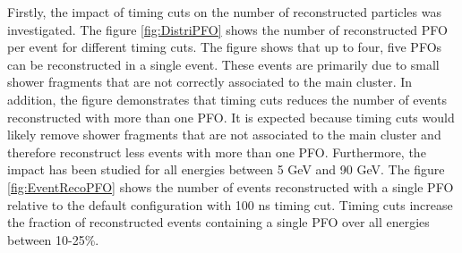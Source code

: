 Firstly, the impact of timing cuts on the number of reconstructed particles was investigated. The figure \ref{fig:DistriPFO} shows the number of reconstructed PFO per event for different timing cuts. The figure shows that up to four, five PFOs can be reconstructed in a single event. These events are primarily due to small shower fragments that are not correctly associated to the main cluster. In addition, the figure demonstrates that timing cuts reduces the number of events reconstructed with more than one PFO. It is expected because timing cuts would likely remove shower fragments that are not associated to the main cluster and therefore reconstruct less events with more than one PFO. Furthermore, the impact has been studied for all energies between 5 GeV and 90 GeV. The figure \ref{fig:EventRecoPFO} shows the number of events reconstructed with a single PFO relative to the default configuration with 100 ns timing cut. Timing cuts increase the fraction of reconstructed events containing a single PFO over all energies between 10-25\%.

